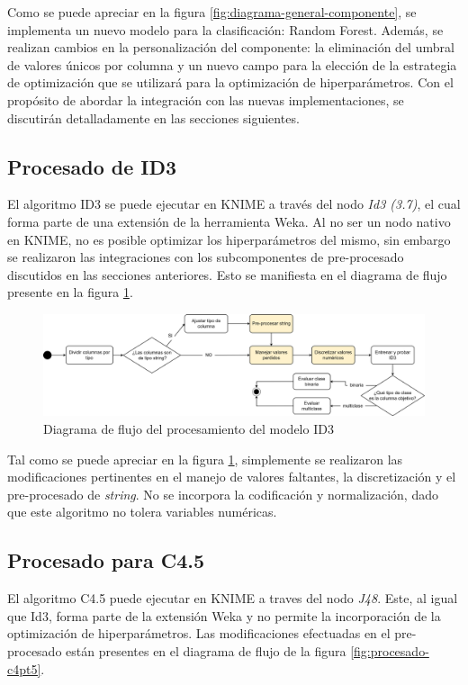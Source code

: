 Como se puede apreciar en la figura \ref{fig:diagrama-general-componente}, se implementa un nuevo modelo para la clasificación: Random Forest. Además, se realizan cambios en la personalización del componente: la eliminación del umbral de valores únicos por columna y un nuevo campo para la elección de la estrategia de optimización que se utilizará para la optimización de hiperparámetros. Con el propósito de abordar la integración con las nuevas implementaciones, se discutirán detalladamente en las secciones siguientes.

\subsection{Procesado de ID3}
El algoritmo ID3 se puede ejecutar en KNIME a través del nodo \textit{Id3 (3.7)}, el cual forma parte de una extensión de la herramienta Weka. Al no ser un nodo nativo en KNIME, no es posible optimizar los hiperparámetros del mismo, sin embargo se realizaron las integraciones con los subcomponentes de pre-procesado discutidos en las secciones anteriores. Esto se manifiesta en el diagrama de flujo presente en la figura \ref{fig:procesado-id3}.

\begin{figure}[H]
	\centering
	\includegraphics[width=0.9\linewidth]{"figuras/capi 2/modelos/procesado id3.drawio"}
	\caption{Diagrama de flujo del procesamiento del modelo ID3}
	\label{fig:procesado-id3}
\end{figure}

Tal como se puede apreciar en la figura \ref{fig:procesado-id3}, simplemente se realizaron las modificaciones pertinentes en el manejo de valores faltantes, la discretización y el pre-procesado de \textit{string}. No se incorpora la codificación y normalización, dado que este algoritmo no tolera variables numéricas.

\subsection{Procesado para C4.5}
El algoritmo C4.5 puede ejecutar en KNIME a traves del nodo \textit{J48}. Este, al igual que Id3, forma parte de la extensión Weka y no permite la incorporación de la optimización de hiperparámetros. Las modificaciones efectuadas en el pre-procesado están presentes en el diagrama de flujo de la figura \ref{fig:procesado-c4pt5}.

